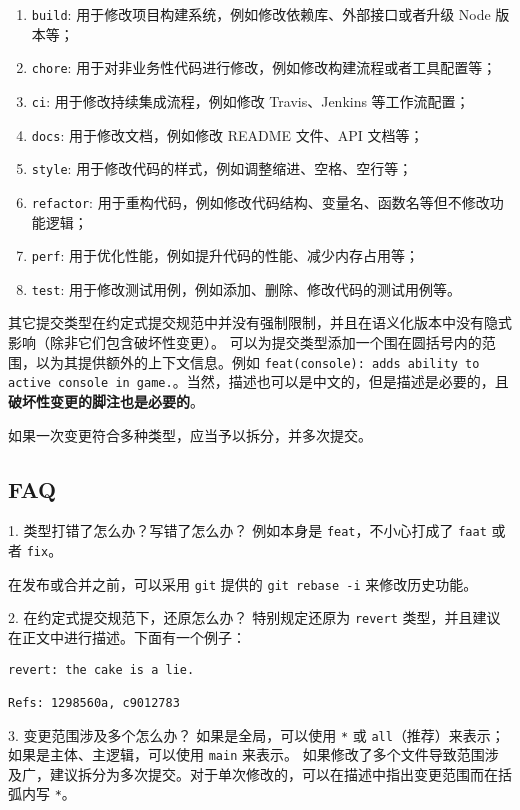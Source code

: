 \begin{enumerate}
\item \verb`build`: 用于修改项目构建系统，例如修改依赖库、外部接口或者升级 Node 版本等；
\item \verb`chore`: 用于对非业务性代码进行修改，例如修改构建流程或者工具配置等；
\item \verb`ci`: 用于修改持续集成流程，例如修改 Travis、Jenkins 等工作流配置；
\item \verb`docs`: 用于修改文档，例如修改 README 文件、API 文档等；
\item \verb`style`: 用于修改代码的样式，例如调整缩进、空格、空行等；
\item \verb`refactor`: 用于重构代码，例如修改代码结构、变量名、函数名等但不修改功能逻辑；
\item \verb`perf`: 用于优化性能，例如提升代码的性能、减少内存占用等；
\item \verb`test`: 用于修改测试用例，例如添加、删除、修改代码的测试用例等。
\end{enumerate}
其它提交类型在约定式提交规范中并没有强制限制，并且在语义化版本中没有隐式影响（除非它们包含破坏性变更）。 可以为提交类型添加一个围在圆括号内的范围，以为其提供额外的上下文信息。例如 \verb`feat(console): adds ability to active console in game.`。当然，描述也可以是中文的，但是描述是必要的，且\textbf{破坏性变更的脚注也是必要的}。

如果一次变更符合多种类型，应当予以拆分，并多次提交。

\subsection{FAQ}
1. 类型打错了怎么办？写错了怎么办？
例如本身是 \verb`feat`，不小心打成了 \verb`faat` 或者 \verb`fix`。

在发布或合并之前，可以采用 \verb`git` 提供的 \verb`git rebase -i` 来修改历史功能。

2. 在约定式提交规范下，还原怎么办？
特别规定还原为 \verb`revert` 类型，并且建议在正文中进行描述。下面有一个例子：
\begin{lstlisting}[language=none]
revert: the cake is a lie.

Refs: 1298560a, c9012783
\end{lstlisting}

3. 变更范围涉及多个怎么办？
如果是全局，可以使用 \verb`*` 或 \verb`all`（推荐）来表示；如果是主体、主逻辑，可以使用 \verb`main` 来表示。
如果修改了多个文件导致范围涉及广，建议拆分为多次提交。对于单次修改的，可以在描述中指出变更范围而在括弧内写 \verb`*`。